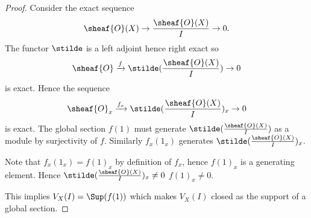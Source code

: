 
\begin{proof}
Consider the exact sequence 
\[\sheaf{O}(X)\rightarrow \frac{\sheaf{O}(X)}{I} \rightarrow 0.\]
The functor $\stilde$ is a left adjoint hence right exact so 
\[\sheaf{O} \xrightarrow{f} \stilde(\frac{\sheaf{O}(X)}{I}) \rightarrow 0\]
is exact.
Hence the sequence
\[\sheaf{O}_x \xrightarrow{f_x} \stilde(\frac{\sheaf{O}(X)}{I})_x \rightarrow 0\]
is exact. 
The global section $f(1)$ must generate $\stilde(\frac{\sheaf{O}(X)}{I})$ as a module by surjectivity of $f$.
Similarly $f_x(1_x)$ generates $\stilde(\frac{\sheaf{O}(X)}{I})_x$.

Note that $f_x(1_x) = f(1)_x$ by definition of $f_x$, hence $f(1)_x$ is a generating element.
Hence $\stilde(\frac{\sheaf{O}(X)}{I})_x \neq 0$ \iff $f(1)_x \neq 0$. 

This implies $V_X(I) = \Sup(f(1))$ which makes $V_X(I)$ closed as the support of a global section.
\end{proof}
